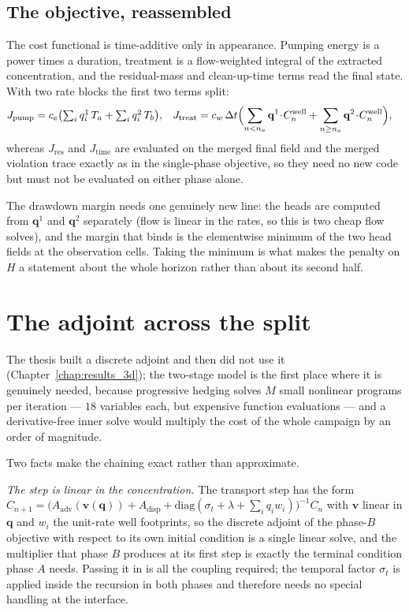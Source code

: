 \documentclass[11pt]{article}
\newcommand{\qq}{\mathbf{q}}
\begin{document}
\subsection{The objective, reassembled}

The cost functional is time-additive only in appearance. Pumping energy is a
power times a duration, treatment is a flow-weighted integral of the extracted
concentration, and the residual-mass and clean-up-time terms read the final state.
With two rate blocks the first two terms split:
\begin{align}
J_{\text{pump}} &= c_e\bigl(\textstyle\sum_i q^1_i\,T_a+\sum_i q^2_i\,T_b\bigr),
&
J_{\text{treat}} &= c_w\,\Delta t\Bigl(\sum_{n<n_a} \qq^{1}\!\cdot\! C^{\text{well}}_n
+\sum_{n\ge n_a} \qq^{2}\!\cdot\! C^{\text{well}}_n\Bigr),
\label{eq:appx-cost}
\end{align}
whereas $J_{\text{res}}$ and $J_{\text{time}}$ are evaluated on the merged final
field and the merged violation trace exactly as in the single-phase objective, so
they need no new code but must not be evaluated on either phase alone.

The drawdown margin needs one genuinely new line: the heads are computed from
$\qq^{1}$ and $\qq^{2}$ separately (flow is linear in the rates, so this is two
cheap flow solves), and the margin that binds is the elementwise minimum of the
two head fields at the observation cells. Taking the minimum is what makes the
penalty on $H$ a statement about the whole horizon rather than about its second
half.

\section{The adjoint across the split}
\label{sec:appx-adj}

The thesis built a discrete adjoint and then did not use it
(Chapter~\ref{chap:results_3d}); the two-stage model is the first place where it
is genuinely needed, because progressive hedging solves $M$ small nonlinear
programs per iteration --- $18$ variables each, but expensive function
evaluations --- and a derivative-free inner solve would multiply the cost of the
whole campaign by an order of magnitude.

Two facts make the chaining exact rather than approximate.

\emph{The step is linear in the concentration.} The transport step has the form
$C_{n+1}=\bigl(A_{\text{adv}}(\mathbf v(\qq))+A_{\text{disp}}+\mathrm{diag}(\sigma_t+\lambda+\textstyle\sum_i q_i w_i)\bigr)^{-1}C_n$
with $\mathbf v$ linear in $\qq$ and $w_i$ the unit-rate well footprints, so the
discrete adjoint of the phase-$B$ objective with respect to its own initial
condition is a single linear solve, and the multiplier that phase $B$ produces at
its first step is exactly the terminal condition phase $A$ needs. Passing it in
is all the coupling required; the temporal factor $\sigma_t$ is applied inside
the recursion in both phases and therefore needs no special handling at the
interface.
\end{document}
